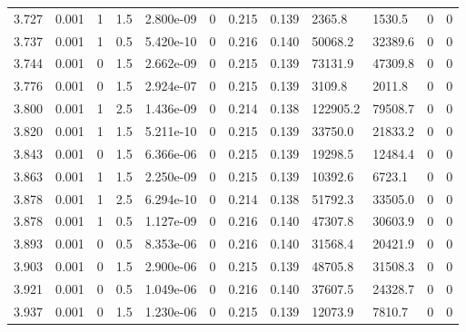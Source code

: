 \documentclass[preview]{standalone}
\begin{document}
{{{{{{\begin{tabular}{L{1.2cm}C{1.2cm} C{0.3cm}C{0.5cm} C{1.4cm}C{1.4cm} C{1.4cm}C{1.4cm} C{1.6cm}C{1.6cm} C{1.6cm}C{1.6cm}}
  3.727  &  0.001  & 1     & 1.5 &  2.800e-09  & 0  &  0.215&   0.139& 2365.8 & 1530.5   &  0 & 0  \\ 
  3.737  &  0.001  & 1     & 0.5 &  5.420e-10  & 0  &  0.216&   0.140& 50068.2 & 32389.6   &  0 & 0  \\ 
  3.744  &  0.001  & 0     & 1.5 &  2.662e-09  & 0  &  0.215&   0.139& 73131.9 & 47309.8   &  0 & 0  \\ 
  3.776  &  0.001  & 0     & 1.5 &  2.924e-07  & 0  &  0.215&   0.139& 3109.8 & 2011.8   &  0 & 0  \\ 
  3.800  &  0.001  & 1     & 2.5 &  1.436e-09  & 0  &  0.214&   0.138& 122905.2 & 79508.7   &  0 & 0  \\ 
  3.820  &  0.001  & 1     & 1.5 &  5.211e-10  & 0  &  0.215&   0.139& 33750.0 & 21833.2   &  0 & 0  \\ 
  3.843  &  0.001  & 0     & 1.5 &  6.366e-06  & 0  &  0.215&   0.139& 19298.5 & 12484.4   &  0 & 0  \\ 
  3.863  &  0.001  & 1     & 1.5 &  2.250e-09  & 0  &  0.215&   0.139& 10392.6 & 6723.1   &  0 & 0  \\ 
  3.878  &  0.001  & 1     & 2.5 &  6.294e-10  & 0  &  0.214&   0.138& 51792.3 & 33505.0   &  0 & 0  \\ 
  3.878  &  0.001  & 1     & 0.5 &  1.127e-09  & 0  &  0.216&   0.140& 47307.8 & 30603.9   &  0 & 0  \\ 
  3.893  &  0.001  & 0     & 0.5 &  8.353e-06  & 0  &  0.216&   0.140& 31568.4 & 20421.9   &  0 & 0  \\ 
  3.903  &  0.001  & 0     & 1.5 &  2.900e-06  & 0  &  0.215&   0.139& 48705.8 & 31508.3   &  0 & 0  \\ 
  3.921  &  0.001  & 0     & 0.5 &  1.049e-06  & 0  &  0.216&   0.140& 37607.5 & 24328.7   &  0 & 0  \\ 
  3.937  &  0.001  & 0     & 1.5 &  1.230e-06  & 0  &  0.215&   0.139& 12073.9 & 7810.7   &  0 & 0  \\ 
\hline 
\end{tabular} 

}}}}}}
\end{document}
